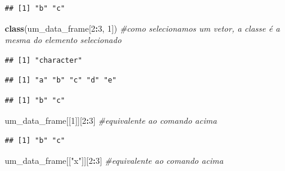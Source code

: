 \documentclass[
]{book}
\newenvironment{Shaded}{\begin{snugshade}}{\end{snugshade}}
\newcommand{\CommentTok}[1]{\textcolor[rgb]{0.56,0.35,0.01}{\textit{#1}}}
\newcommand{\DecValTok}[1]{\textcolor[rgb]{0.00,0.00,0.81}{#1}}
\newcommand{\FunctionTok}[1]{\textcolor[rgb]{0.13,0.29,0.53}{\textbf{#1}}}
\newcommand{\NormalTok}[1]{#1}
\newcommand{\SpecialCharTok}[1]{\textcolor[rgb]{0.81,0.36,0.00}{\textbf{#1}}}
\newcommand{\StringTok}[1]{\textcolor[rgb]{0.31,0.60,0.02}{#1}}
\begin{document}
\begin{verbatim}
## [1] "b" "c"
\end{verbatim}

\begin{Shaded}
\begin{Highlighting}[]
\FunctionTok{class}\NormalTok{(um\_data\_frame[}\DecValTok{2}\SpecialCharTok{:}\DecValTok{3}\NormalTok{, }\DecValTok{1}\NormalTok{]) }\CommentTok{\#como selecionamos um vetor, a classe é a mesma do elemento selecionado}
\end{Highlighting}
\end{Shaded}

\begin{verbatim}
## [1] "character"
\end{verbatim}

\begin{Shaded}
\end{Shaded}

\begin{verbatim}
## [1] "a" "b" "c" "d" "e"
\end{verbatim}

\begin{Shaded}
\end{Shaded}

\begin{verbatim}
## [1] "b" "c"
\end{verbatim}

\begin{Shaded}
\begin{Highlighting}[]
\NormalTok{um\_data\_frame[[}\DecValTok{1}\NormalTok{]][}\DecValTok{2}\SpecialCharTok{:}\DecValTok{3}\NormalTok{] }\CommentTok{\#equivalente ao comando acima}
\end{Highlighting}
\end{Shaded}

\begin{verbatim}
## [1] "b" "c"
\end{verbatim}

\begin{Shaded}
\begin{Highlighting}[]
\NormalTok{um\_data\_frame[[}\StringTok{"x"}\NormalTok{]][}\DecValTok{2}\SpecialCharTok{:}\DecValTok{3}\NormalTok{] }\CommentTok{\#equivalente ao comando acima}
\end{Highlighting}
\end{Shaded}
\end{document}
